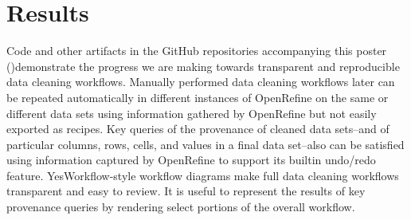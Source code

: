 \section{Results}

Code and other artifacts in the GitHub repositories accompanying this poster (\cite{openrefine-provenance-repo, openrefine-reproducibility-repo})demonstrate the progress we are making towards transparent and reproducible data cleaning workflows. Manually performed data cleaning workflows later can be repeated automatically in different instances of OpenRefine on the same or different data sets using information gathered by OpenRefine but not easily exported as recipes. Key queries of the provenance of cleaned data sets--and of particular columns, rows, cells, and values in a final data set--also can be satisfied using information captured by OpenRefine to support its builtin undo/redo feature. YesWorkflow-style workflow diagrams make full data cleaning workflows transparent and easy to review. It is useful to represent the results of key provenance queries by rendering select portions of the overall workflow.